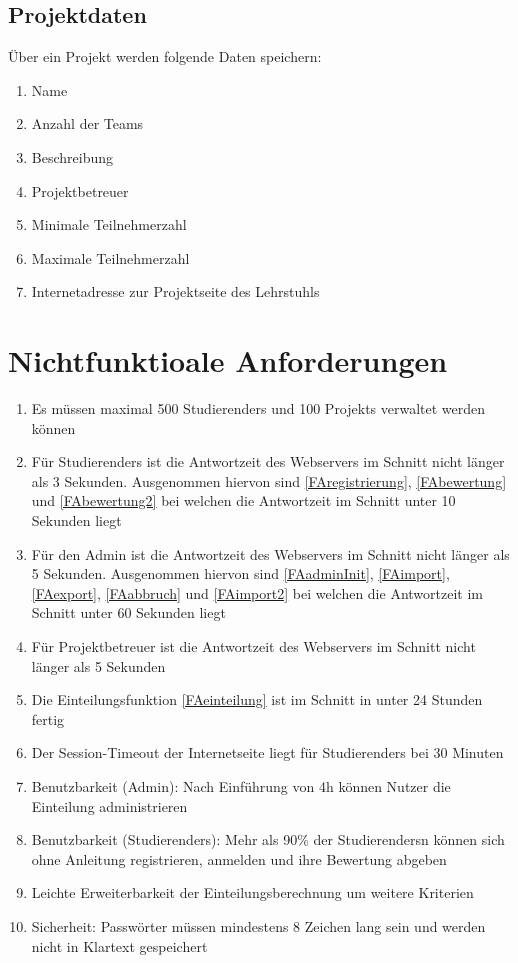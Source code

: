 \documentclass[parskip=full]{scrartcl}
\newcommand{\swtLabel}[1]{\textbf{/#1\arabic*0/}}
\begin{document}
\subsection{\gls{Projekt}daten}
Über ein \gls{Projekt} werden folgende Daten speichern:
\begin{enumerate}[label=\swtLabel{D},resume] 
  \item Name \label{DProjektAnfang}
  \item Anzahl der \glspl{Team}
  \item Beschreibung
  \item \gls{Projektbetreuer}
  \item Minimale Teilnehmerzahl
  \item Maximale Teilnehmerzahl
  \item Internetadresse zur \gls{Projekt}seite des Lehrstuhls \label{DProjektEnde}
\end{enumerate}



\section{Nichtfunktioale Anforderungen}

\begin{enumerate}[label=\swtLabel{NF}]
  \item Es müssen maximal 500 \glspl{Studierender} und 100 \glspl{Projekt} verwaltet werden
  können
  \item Für \glspl{Studierender} ist die Antwortzeit des Webservers im Schnitt nicht
  länger als 3 Sekunden. Ausgenommen hiervon sind \ref{FAregistrierung}, 
  \ref{FAbewertung} und \ref{FAbewertung2} bei welchen die Antwortzeit im
  Schnitt unter 10 Sekunden liegt
  \item Für den \gls{Admin} ist die Antwortzeit des Webservers im Schnitt nicht
  länger als 5 Sekunden. Ausgenommen hiervon sind \ref{FAadminInit}, \ref{FAimport},
  \ref{FAexport}, \ref{FAabbruch} und \ref{FAimport2} bei welchen die Antwortzeit im Schnitt
  unter 60 Sekunden liegt
  \item Für \gls{Projektbetreuer} ist die Antwortzeit des Webservers im Schnitt nicht
  länger als 5 Sekunden
  \item Die \gls{Einteilung}sfunktion \ref{FAeinteilung} ist im Schnitt in unter 24
  Stunden fertig
	\item Der Session-Timeout der Internetseite liegt für \glspl{Studierender} bei 30
	Minuten
	\item Benutzbarkeit (\gls{Admin}): Nach Einführung von 4h können Nutzer die
	\gls{Einteilung} administrieren
	\item Benutzbarkeit (\glspl{Studierender}): Mehr als 90\% der \glspl{Studierender}n können
	sich ohne Anleitung registrieren, anmelden und ihre \gls{Bewertung} abgeben
	\item Leichte Erweiterbarkeit der \gls{Einteilung}sberechnung um weitere Kriterien
	\item Sicherheit: Passwörter müssen mindestens 8 Zeichen lang sein und werden
	nicht in Klartext gespeichert
 

\end{enumerate}
\end{document}
